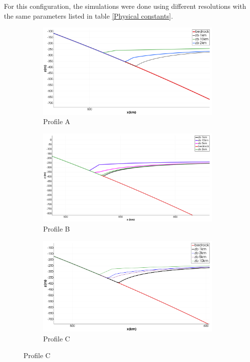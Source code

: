 \documentclass{article}
\begin{document}
For this configuration, the simulations were done using different resolutions with the same parameters listed in table \ref{Physical constants}. 

\begin{figure}[!h]
	\centering %
	\begin{subfigure}{0.4\textwidth}
		\includegraphics[width=\linewidth]{../fig/zb_10km_2km_1km.png}
		\caption{Profile A}
		\label{Grounded_line_profile_A}
	\end{subfigure}\hfil %
	\begin{subfigure}{0.4\textwidth}
		\includegraphics[width=\linewidth]{../fig/zb_10km_5km_2km_1km_CONE_profileB.png}
		\caption{Profile B}
		\label{Grounded_line_profile_B}
	\end{subfigure}\hfil %
	\begin{subfigure}{0.4\textwidth}
		\includegraphics[width=\linewidth]{../fig/zb_10km_5km_2km_1km_CONE_profileC.png}
		\caption{Profile C}
		\label{Grounded_line_profile_C}
	\end{subfigure}


\end{figure}
\end{document}
